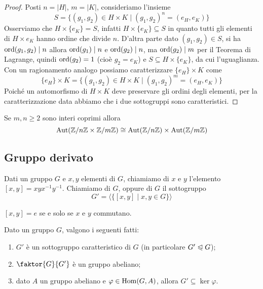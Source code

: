 \documentclass[11pt]{scrartcl}
\begin{document}
\begin{proof}
    Posti $n = |H|$, $m = |K|$, consideriamo l'insieme
    \[
        S = \{(g_1, g_2) \in H\times K\mid (g_1, g_2)^n = (e_H, e_K)\}\]
    Osserviamo che $H\times \{e_K\} = S$, infatti 
    $H\times \{e_K\} \subseteq S$ in quanto tutti gli elementi di $H\times{e_K}$
    hanno ordine che divide $n$. D'altra parte dato $(g_1, g_2) \in S$, si ha
    $\operatorname{ord}(g_1, g_2) \mid n$ allora $\operatorname{ord}(g_1)\mid n$ e $\operatorname{ord}(g_2)\mid n$, ma 
    $\operatorname{ord}(g_2) \mid m$ per il Teorema di Lagrange, quindi $\operatorname{ord}(g_2) = 1$ (cioè $g_2 = e_K$) e
    $S \subseteq H\times\{e_K\}$, da cui l'uguaglianza. Con un ragionamento
    analogo possiamo caratterizzare $\{e_H\} \times K$ come 
    \[
        \{e_H\} \times K = \{(g_1, g_2) \in H\times K\mid (g_1, g_2)^m = (e_H, e_K)\}
    \] Poiché un automorfismo di $H\times K$ deve preservare gli ordini degli
    elementi, per la caratterizzazione data abbiamo che i due sottogruppi sono
    caratteristici.
\end{proof}

\begin{corollary}
    Se $m, n \geqslant 2$ sono interi coprimi allora
    \[
        \operatorname{Aut}({\mathbb Z}/n{\mathbb Z}\times{\mathbb Z}/m{\mathbb Z}) \cong \operatorname{Aut}({\mathbb Z}/n{\mathbb Z})\times \operatorname{Aut}({\mathbb Z}/m{\mathbb Z})
    \]
\end{corollary}

\newpage

\subsection{Gruppo derivato}

\begin{definition}
    Dati un gruppo $G$ e $x, y$ elementi di $G$, chiamiamo 
    di $x$ e $y$ l'elemento $[x, y] = xyx^{-1}y^{-1}$. Chiamiamo  di $G$, oppure  di $G$
     il sottogruppo 
    \[
        G' = \langle\{[x, y]\mid x, y \in G\}\rangle
    \]
\end{definition}

\begin{remark}
    $[x, y] = e$ se e solo se $x$ e $y$ commutano.
\end{remark}

\begin{proposition}
    Dato un gruppo $G$, valgono i seguenti fatti:
    \begin{enumerate}[(1)]
        \item $G'$ è un sottogruppo caratteristico di $G$ (in particolare $G' \trianglelefteqslant G$);
        \item $\faktor{G}{G'}$ è un gruppo abeliano;
        \item dato $A$ un gruppo abeliano e $\varphi \in \operatorname{Hom}(G, A)$,
        allora $G' \subseteq \ker\varphi$.
    \end{enumerate}
\end{proposition}
\end{document}
